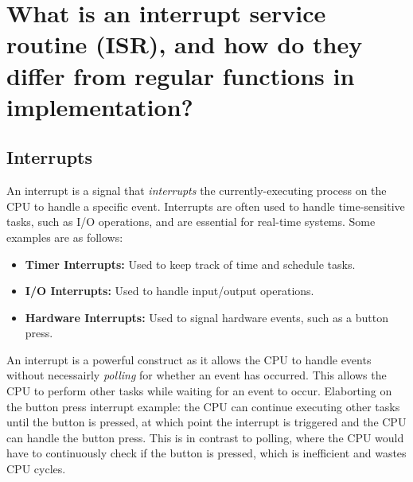 \documentclass[main.tex]{subfiles}
\begin{document}
\section{What is an interrupt service routine (ISR), and how do they differ from regular functions in implementation?}

\spoilerline

\subsection{Interrupts}
An interrupt is a signal that \textit{interrupts} the currently-executing process on the CPU to handle a specific event. Interrupts are often used to handle time-sensitive tasks, such as I/O operations, and are essential for real-time systems. Some examples are as follows:
\begin{itemize}
    \item \textbf{Timer Interrupts:} Used to keep track of time and schedule tasks.
    \item \textbf{I/O Interrupts:} Used to handle input/output operations.
    \item \textbf{Hardware Interrupts:} Used to signal hardware events, such as a button press.
\end{itemize}
\noindent An interrupt is a powerful construct as it allows the CPU to handle events without necessairly \textit{polling} for whether an event has occurred. This allows the CPU to perform other tasks while waiting for an event to occur. \newline
\newline
\noindent Elaborting on the button press interrupt example: the CPU can continue executing other tasks until the button is pressed, at which point the interrupt is triggered and the CPU can handle the button press. This is in contrast to polling, where the CPU would have to continuously check if the button is pressed, which is inefficient and wastes CPU cycles.
\end{document}
